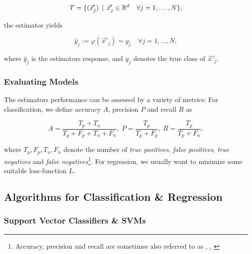 \begin{equation}
\mathcal{T} = \{ (\vec x'_j) \, \mid \, \vec x'_j \in \mathbb{R}^d \quad \forall j = 1,\ldots,N \},
\end{equation}

the estimator yields

\begin{equation}
\hat y_j := \varphi({\vec x'_j}) = y_j \quad \forall j = 1,\ldots,N,
\end{equation}

where $\hat y_j$ is the estimators response, and $y_j$ denotes the true class of $\vec x'_j$.

\subsubsection{Evaluating Models}


The estimators performance can be assessed by a variety of metrics: For classification, we define accuracy $A$, precision $P$ and recall $R$ as

\begin{equation}
A = \frac{T_p + T_n}{T_p + F_p + T_n + F_n}, \; P = \frac{T_p}{T_p + F_p}, \; R = \frac{T_p}{T_p + F_n},
\end{equation}


where $T_p, F_p, T_n, F_n$ denote the number of \emph{true positives}, \emph{false positives}, \emph{true negatives} and \emph{false negatives}\footnote{Accuracy, precision and recall are sometimes also referred to as \emph{}, \emph{}, \emph{}}. For regression, we usually want to minimize some suitable loss-function $L$.

\subsection{Algorithms for Classification \& Regression}
\label{subsec:algorithms-classification-and-regression}
\subsubsection{Support Vector Classifiers \& SVMs}

